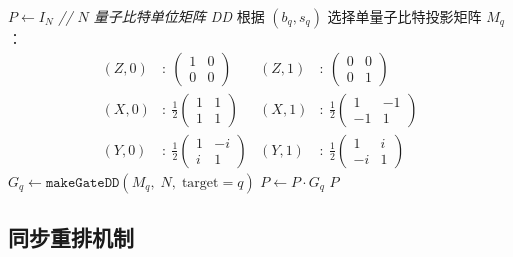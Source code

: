\documentclass[12pt, a4paper]{article}
\begin{document}
\begin{algorithm}[H]
\caption{BuildProjector：构建 $N$ 量子比特投影算子 DD}
\begin{algorithmic}[1]

\State $P \leftarrow I_N$
    \quad\textit{// $N$ 量子比特单位矩阵 DD}
    \State 根据 $(b_q, s_q)$ 选择单量子比特投影矩阵 $M_q$：
    \begin{align*}
        (Z,0)&:\ \begin{pmatrix}1&0\\0&0\end{pmatrix} &
        (Z,1)&:\ \begin{pmatrix}0&0\\0&1\end{pmatrix} \\
        (X,0)&:\ \tfrac{1}{2}\begin{pmatrix}1&1\\1&1\end{pmatrix} &
        (X,1)&:\ \tfrac{1}{2}\begin{pmatrix}1&-1\\-1&1\end{pmatrix} \\
        (Y,0)&:\ \tfrac{1}{2}\begin{pmatrix}1&-i\\i&1\end{pmatrix} &
        (Y,1)&:\ \tfrac{1}{2}\begin{pmatrix}1&i\\-i&1\end{pmatrix}
    \end{align*}
    \State $G_q \leftarrow \texttt{makeGateDD}(M_q,\; N,\; \mathrm{target}=q)$
    \State $P \leftarrow P \cdot G_q$
\EndFor
\State \Return $P$
\end{algorithmic}
\end{algorithm}

\subsection{同步重排机制}
\end{document}
